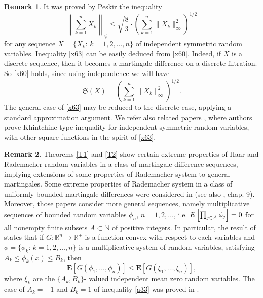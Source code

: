 \documentclass[12pt,reqno,fleqn]{amsart}
\theoremstyle{definition}
\theoremstyle{definition}
\newtheorem{remark}{Remark}[section]
\theoremstyle{remark}
\def\ZS{\ensuremath{\mathfrak S}}
\def\ZN{\ensuremath{\mathbb N}}
\numberwithin{equation}{section}
\newcommand {\e }[1]{\eqref{#1}}
\begin{document}
\begin{remark}
	It was proved by Peskir \cite{Pes} the inequality
\begin{equation}\label{x63}
	\left\|\sum_{k=1}^nX_k\right\|_\psi \le \sqrt{\frac{8}{3}}\cdot \left(\sum_{k=1}^n\|X_k\|_\infty^2\right)^{1/2}
\end{equation}
for any sequence $X=\{X_k:\, k=1,2,\ldots,n\}$ of independent symmetric random variables. Inequality \e{x63} can be easily deduced from \e{x60}. Indeed, if $X$ is a discrete sequence, then it becomes a martingale-difference on a discrete filtration. So \e{x60} holds, since using independence we will have
\begin{equation}\label{x61}
	\ZS(X)=\left(\sum_{k=1}^n\|X_k\|_\infty^2\right)^{1/2}.
\end{equation}
The general case of \e{x63} may be reduced to the discrete case, applying a standard approximation argument.  
We refer also related papers  \cite{Whi, Ros}, where authors prove Khintchine type inequality for independent symmetric random variables, with other square functions in the spirit of \e{x63}.
\end{remark}
\begin{remark}
	Theorems \ref{T1} and \ref{T2} show certain extreme properties of Haar and Radema\-cher random variables in a class of martingale difference sequences, implying extensions of some properties of Rademacher system to general martingales. Some extreme properties of Rademacher system in a class of uniformly bounded martingale differences were considered in \cite{Kar4, Kar1, Kwa} (see also \cite{Ast}, chap. 9). Moreover, those papers consider more general sequences, namely multiplicative sequences of bounded random variables $\phi_n$, $n=1,2,\ldots$, i.e.  ${\textbf E}\left[\prod_{j\in A}\phi_{j}\right]=0$ for all nonempty finite subsets $A\subset \ZN$ of positive integers. In particular, the result of \cite{Kar4} states that if $G:{\mathbb R}^n\to {\mathbb R}^+$ is a function convex with respect to each variables and $\phi=\{\phi_k:\, k=1,2,\ldots, n\}$ is a  multiplicative system of random variables, satisfying  $A_k\le \phi_k(x)\le B_k$, then 
	\begin{equation}\label{a33}
		\textbf{E}\left[G\left(\phi_1,\ldots,\phi_n\right)\right]\le \textbf{E}\left[G\left(\xi_1,\ldots,\xi_n\right)\right],
	\end{equation}
	where $\xi_k$ are the $\{A_k,B_k\}$- valued independent mean zero random variables. The case of $A_k=-1$ and $B_k=1$ of inequality \e{a33} was proved in \cite{Kwa}.
\end{remark}
\end{document}
